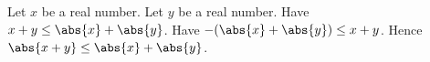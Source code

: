 Let \(x\) be a real number.
Let \(y\) be a real number.
Have \(x+y\le\abs{x}+\abs{y}\).
Have \(-(\abs{x}+\abs{y})\le x+y\).
Hence \(\abs{x+y}\le\abs{x}+\abs{y}\).
